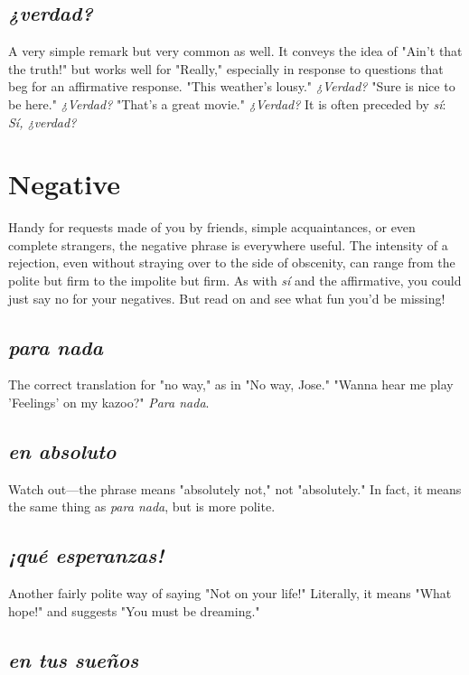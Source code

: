 \subsection{\emph{¿verdad?}}

A very simple remark but very common as well. It conveys the
idea of "Ain't that the truth!" but works well for "Really," especially
in response to questions that beg for an affirmative response. "This
weather's lousy." \emph{¿Verdad?} "Sure is nice to be here." \emph{¿Verdad?} "That's
a great movie." \emph{¿Verdad?} It is often preceded by \emph{sí}: \emph{Sí, ¿verdad?}

\section{Negative}

Handy for requests made of you by friends, simple acquaintances, or even complete strangers, the negative phrase is everywhere
useful. The intensity of a rejection, even without straying over to the
side of obscenity, can range from the polite but firm to the impolite
but firm. As with \emph{sí} and the affirmative, you could just say no for your
negatives. But read on and see what fun you'd be missing!

\subsection{\emph{para nada}}

The correct translation for "no way," as in "No way, Jose."
"Wanna hear me play 'Feelings' on my kazoo?" \emph{Para nada}.

\subsection{\emph{en absoluto}}

Watch out---the phrase means "absolutely not," not "absolutely." In fact, it means the same thing as \emph{para nada}, but is
more polite.

\subsection{\emph{¡qué esperanzas!}}

Another fairly polite way of saying "Not on your life!" Literally, it means "What hope!" and suggests "You must be dreaming."

\subsection{\emph{en tus sueños}}

